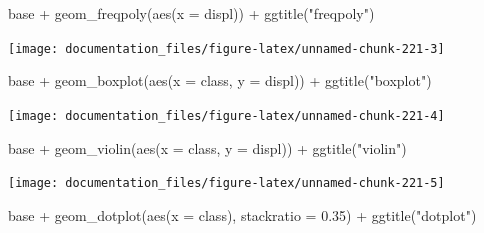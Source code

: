 \documentclass[
]{article}
\newenvironment{Shaded}{\begin{snugshade}}{\end{snugshade}}
\newcommand{\AttributeTok}[1]{\textcolor[rgb]{0.77,0.63,0.00}{#1}}
\newcommand{\FloatTok}[1]{\textcolor[rgb]{0.00,0.00,0.81}{#1}}
\newcommand{\FunctionTok}[1]{\textcolor[rgb]{0.00,0.00,0.00}{#1}}
\newcommand{\NormalTok}[1]{#1}
\newcommand{\SpecialCharTok}[1]{\textcolor[rgb]{0.00,0.00,0.00}{#1}}
\newcommand{\StringTok}[1]{\textcolor[rgb]{0.31,0.60,0.02}{#1}}
\begin{document}
\begin{Shaded}
\begin{Highlighting}[]
\NormalTok{base }\SpecialCharTok{+} \FunctionTok{geom\_freqpoly}\NormalTok{(}\FunctionTok{aes}\NormalTok{(}\AttributeTok{x =}\NormalTok{ displ)) }\SpecialCharTok{+} \FunctionTok{ggtitle}\NormalTok{(}\StringTok{"freqpoly"}\NormalTok{)}
\end{Highlighting}
\end{Shaded}

\begin{center}\texttt{[image: documentation\_files/figure-latex/unnamed-chunk-221-3]} \end{center}

\begin{Shaded}
\begin{Highlighting}[]
\NormalTok{base }\SpecialCharTok{+} \FunctionTok{geom\_boxplot}\NormalTok{(}\FunctionTok{aes}\NormalTok{(}\AttributeTok{x =}\NormalTok{ class, }\AttributeTok{y =}\NormalTok{ displ)) }\SpecialCharTok{+} \FunctionTok{ggtitle}\NormalTok{(}\StringTok{"boxplot"}\NormalTok{)}
\end{Highlighting}
\end{Shaded}

\begin{center}\texttt{[image: documentation\_files/figure-latex/unnamed-chunk-221-4]} \end{center}

\begin{Shaded}
\begin{Highlighting}[]
\NormalTok{base }\SpecialCharTok{+} \FunctionTok{geom\_violin}\NormalTok{(}\FunctionTok{aes}\NormalTok{(}\AttributeTok{x =}\NormalTok{ class, }\AttributeTok{y =}\NormalTok{ displ)) }\SpecialCharTok{+} \FunctionTok{ggtitle}\NormalTok{(}\StringTok{"violin"}\NormalTok{)}
\end{Highlighting}
\end{Shaded}

\begin{center}\texttt{[image: documentation\_files/figure-latex/unnamed-chunk-221-5]} \end{center}

\begin{Shaded}
\begin{Highlighting}[]
\NormalTok{base }\SpecialCharTok{+} \FunctionTok{geom\_dotplot}\NormalTok{(}\FunctionTok{aes}\NormalTok{(}\AttributeTok{x =}\NormalTok{ class), }\AttributeTok{stackratio =} \FloatTok{0.35}\NormalTok{) }\SpecialCharTok{+} \FunctionTok{ggtitle}\NormalTok{(}\StringTok{"dotplot"}\NormalTok{)}
\end{Highlighting}
\end{Shaded}
\end{document}
